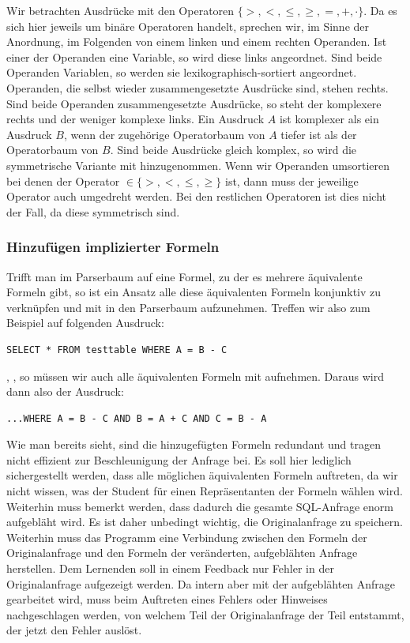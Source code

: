Wir betrachten Ausdrücke mit den Operatoren $\{>,<,\leq,\geq,=,+,\cdot\}$. Da es sich hier jeweils um binäre Operatoren handelt, sprechen wir, im Sinne der Anordnung, im Folgenden von einem linken und einem rechten Operanden. Ist einer der Operanden eine Variable, so wird diese links angeordnet. Sind beide Operanden Variablen, so werden sie lexikographisch-sortiert angeordnet. Operanden, die selbst wieder zusammengesetzte Ausdrücke sind, stehen rechts. Sind beide Operanden zusammengesetzte Ausdrücke, so steht der komplexere rechts und der weniger komplexe links. Ein Ausdruck $A$ ist komplexer als ein Ausdruck $B$, wenn der zugehörige Operatorbaum von $A$ tiefer ist als der Operatorbaum von $B$. Sind beide Ausdrücke gleich komplex, so wird die symmetrische Variante mit hinzugenommen. Wenn wir Operanden umsortieren bei denen der Operator $\in \{>,<,\leq,\geq\}$ ist, dann muss der jeweilige Operator auch umgedreht werden. Bei den restlichen Operatoren ist dies nicht der Fall, da diese symmetrisch sind.

\subsubsection{Hinzufügen implizierter Formeln}

Trifft man im Parserbaum auf eine Formel, zu der es mehrere äquivalente Formeln gibt, so ist ein Ansatz alle diese äquivalenten Formeln konjunktiv zu verknüpfen und mit in den Parserbaum aufzunehmen. Treffen wir also zum Beispiel auf folgenden Ausdruck: \begin{verbatim}SELECT * FROM testtable WHERE A = B - C\end{verbatim}, , so müssen wir auch alle äquivalenten Formeln mit aufnehmen. Daraus wird dann also der Ausdruck: \begin{verbatim}...WHERE A = B - C AND B = A + C AND C = B - A\end{verbatim}

Wie man bereits sieht, sind die hinzugefügten Formeln redundant und tragen nicht effizient zur Beschleunigung der Anfrage bei. Es soll hier lediglich sichergestellt werden, dass alle möglichen äquivalenten Formeln auftreten, da wir nicht wissen, was der Student für einen Repräsentanten der Formeln wählen wird. Weiterhin muss bemerkt werden, dass dadurch die gesamte SQL-Anfrage enorm aufgebläht wird. Es ist daher unbedingt wichtig, die Originalanfrage zu speichern. Weiterhin muss das Programm eine Verbindung zwischen den Formeln der Originalanfrage und den Formeln der veränderten, aufgeblähten Anfrage herstellen. Dem Lernenden soll in einem Feedback nur Fehler in der Originalanfrage aufgezeigt werden. Da intern aber mit der aufgeblähten Anfrage gearbeitet wird, muss beim Auftreten eines Fehlers oder Hinweises nachgeschlagen werden, von welchem Teil der Originalanfrage der Teil entstammt, der jetzt den Fehler auslöst.

